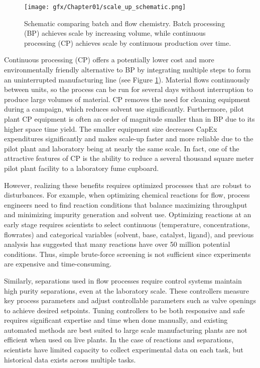 \begin{figure}[bt]
  \texttt{[image: gfx/Chapter01/scale\_up\_schematic.png]}
  \caption{Schematic comparing batch and flow chemistry. Batch processing (BP) achieves scale by increasing volume, while continuous processing (CP) achieves scale by continuous production over time.}
  \label{batch_v_flow}
\end{figure}

Continuous processing (CP) offers a potentially lower cost and more environmentally friendly alternative to BP by integrating multiple steps to form an uninterrupted manufacturing line (see Figure \ref{batch_v_flow}). Material flows continuously between units, so the process can be run for several days without interruption to produce large volumes of material. CP removes the need for cleaning equipment during a campaign, which reduces solvent use significantly.\cite{Lee2016} Furthermore, pilot plant CP equipment is often an order of magnitude smaller than in BP due to its higher space time yield.\cite{Elvira2013} The smaller equipment size decreases CapEx expenditures significantly\cite{Escriba-Gelonch2019} and makes scale-up faster and more reliable due to the pilot plant and laboratory being at nearly the same scale.\cite{Cole2019, Rogers2019} In fact, one of the attractive features of CP is the ability to reduce a several thousand square meter pilot plant facility to a laboratory fume cupboard.\cite{Cole2017, Cole2019} 


However, realizing these benefits requires optimized processes that are robust to disturbances. For example, when optimizing chemical reactions for flow, process engineers need to find reaction conditions that balance maximizing throughput and minimizing impurity generation and solvent use. Optimizing reactions at an early stage requires scientists to select continuous (temperature, concentrations, flowrates) and categorical variables (solvent, base, catalyst, ligand), and previous analysis has suggested that many reactions have over 50 million potential conditions. Thus, simple brute-force screening is not sufficient since experiments are expensive and time-consuming.

Similarly, separations used in flow processes require control systems maintain high purity separations, even at the laboratory scale. These controllers measure key process parameters and adjust controllable parameters such as valve openings to achieve desired setpoints. Tuning controllers to be both responsive and safe requires significant expertise and time when done manually, and existing automated methods are best suited to large scale manufacturing plants are not efficient when used on live plants. In the case of reactions and separations, scientists have limited capacity to collect experimental data on each task, but historical data exists across multiple tasks.

